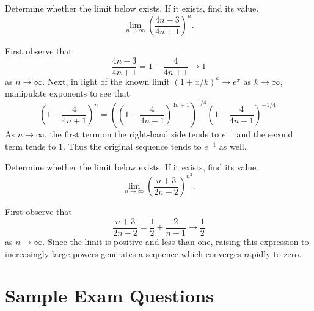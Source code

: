 \documentclass{ximera}
\begin{document}
\begin{question}%

Determine whether the limit below exists. If it exists, find its value.
\[\lim_{n \rightarrow \infty} \left(\frac{4n - 3}{4n + 1}\right)^{n}.\] 
\begin{multiplechoice}
\end{multiplechoice}
\begin{feedback}
First observe that 
\[\frac{4n - 3}{4n + 1} = 1 - \frac{4}{4n + 1} \rightarrow 1\]
as \(n \rightarrow \infty\). Next, in light of the known limit \((1+x/k)^{k} \rightarrow e^x\) as \(k \rightarrow \infty\), manipulate exponents to see that  \[\left(1 - \frac{4}{4n + 1}\right)^n = \left( \left(1 - \frac{4}{4n + 1}\right)^{4n + 1} \right)^{ 1/4} \left(1 - \frac{4}{4n + 1}\right)^{-1/4}. \] As \(n \rightarrow \infty\), the first term on the right-hand side tends to \(e^{-1}\) and the second term tends to \(1\). Thus the original sequence tends to \(e^{-1}\) as well.
\end{feedback}

\end{question}

\begin{question}%

Determine whether the limit below exists. If it exists, find its value.
\[\lim_{n \rightarrow \infty} \left(\frac{n + 3}{2n - 2}\right)^{n^2}.\] 
\begin{multiplechoice}
\end{multiplechoice}
\begin{feedback}
First observe that 
\[\frac{n + 3}{2n - 2} = \frac{1}{2} + \frac{2}{n - 1} \rightarrow \frac{1}{2}\]
as \(n \rightarrow \infty\). Since the limit is positive and less than one, raising this expression to increasingly large powers generates a sequence which converges rapidly to zero.
\end{feedback}

\end{question}

\section*{Sample Exam Questions}
\end{document}
